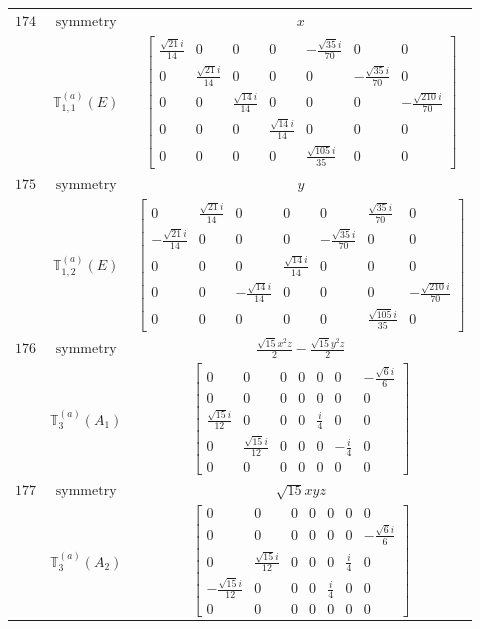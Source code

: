 \documentclass[fleqn,8pt,landscape]{jsarticle}
\begin{document}
\begin{longtable}{ccc}
$ 174 $ & $ \text{symmetry} $ & $ x $ \\
$  $ & $ \mathbb{T}_{1,1}^{(a)}(E) $ & $ \begin{bmatrix} \frac{\sqrt{21} i}{14} & 0 & 0 & 0 & - \frac{\sqrt{35} i}{70} & 0 & 0 \\ 0 & \frac{\sqrt{21} i}{14} & 0 & 0 & 0 & - \frac{\sqrt{35} i}{70} & 0 \\ 0 & 0 & \frac{\sqrt{14} i}{14} & 0 & 0 & 0 & - \frac{\sqrt{210} i}{70} \\ 0 & 0 & 0 & \frac{\sqrt{14} i}{14} & 0 & 0 & 0 \\ 0 & 0 & 0 & 0 & \frac{\sqrt{105} i}{35} & 0 & 0 \end{bmatrix} $ \\ \hline
$ 175 $ & $ \text{symmetry} $ & $ y $ \\
$  $ & $ \mathbb{T}_{1,2}^{(a)}(E) $ & $ \begin{bmatrix} 0 & \frac{\sqrt{21} i}{14} & 0 & 0 & 0 & \frac{\sqrt{35} i}{70} & 0 \\ - \frac{\sqrt{21} i}{14} & 0 & 0 & 0 & - \frac{\sqrt{35} i}{70} & 0 & 0 \\ 0 & 0 & 0 & \frac{\sqrt{14} i}{14} & 0 & 0 & 0 \\ 0 & 0 & - \frac{\sqrt{14} i}{14} & 0 & 0 & 0 & - \frac{\sqrt{210} i}{70} \\ 0 & 0 & 0 & 0 & 0 & \frac{\sqrt{105} i}{35} & 0 \end{bmatrix} $ \\ \hline
$ 176 $ & $ \text{symmetry} $ & $ \frac{\sqrt{15} x^{2} z}{2} - \frac{\sqrt{15} y^{2} z}{2} $ \\
$  $ & $ \mathbb{T}_{3}^{(a)}(A_{1}) $ & $ \begin{bmatrix} 0 & 0 & 0 & 0 & 0 & 0 & - \frac{\sqrt{6} i}{6} \\ 0 & 0 & 0 & 0 & 0 & 0 & 0 \\ \frac{\sqrt{15} i}{12} & 0 & 0 & 0 & \frac{i}{4} & 0 & 0 \\ 0 & \frac{\sqrt{15} i}{12} & 0 & 0 & 0 & - \frac{i}{4} & 0 \\ 0 & 0 & 0 & 0 & 0 & 0 & 0 \end{bmatrix} $ \\ \hline
$ 177 $ & $ \text{symmetry} $ & $ \sqrt{15} x y z $ \\
$  $ & $ \mathbb{T}_{3}^{(a)}(A_{2}) $ & $ \begin{bmatrix} 0 & 0 & 0 & 0 & 0 & 0 & 0 \\ 0 & 0 & 0 & 0 & 0 & 0 & - \frac{\sqrt{6} i}{6} \\ 0 & \frac{\sqrt{15} i}{12} & 0 & 0 & 0 & \frac{i}{4} & 0 \\ - \frac{\sqrt{15} i}{12} & 0 & 0 & 0 & \frac{i}{4} & 0 & 0 \\ 0 & 0 & 0 & 0 & 0 & 0 & 0 \end{bmatrix} $ \\ \hline

\end{longtable}
\end{document}
